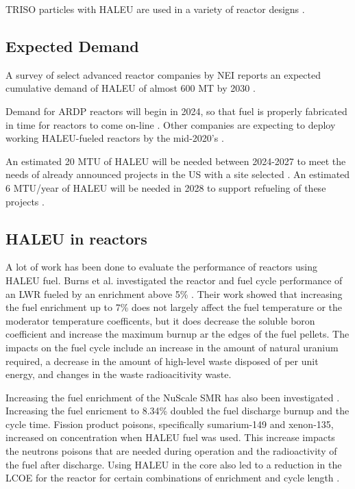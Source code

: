 \gls{TRISO} particles with \gls{HALEU} are used in a variety of reactor designs 
\cite{harlan_x-energy_2018,mitchell_usnc_2020,hussain_advances_2018}.

\subsection{Expected Demand}
A survey of select advanced reactor companies by \gls{NEI} reports an 
expected cumulative demand of \gls{HALEU} of almost 600 MT by 2030 
\cite{korsnick_need_2018}.

Demand for ARDP reactors will begin in 2024, so that fuel is 
properly fabricated in time for reactors to come on-line \cite{noauthor_establishing_2022}.
Other companies are expecting to deploy working \gls{HALEU}-fueled reactors 
by the mid-2020's \cite{noauthor_establishing_2022}.

An estimated 20 MTU of \gls{HALEU} will be needed between 2024-2027 to 
meet the needs of already announced projects in the US with a site 
selected \cite{noauthor_establishing_2022}. An estimated 6 MTU/year of 
\gls{HALEU} will be needed in 2028 to support refueling of these projects 
\cite{noauthor_establishing_2022}. 

\subsection{HALEU in reactors}
A lot of work has been done to evaluate the performance of reactors 
using \gls{HALEU} fuel. Burns et al. investigated the reactor and fuel cycle 
performance of an \gls{LWR} fueled by an enrichment above 5\% \cite{burns_reactor_2020}.
Their work showed that increasing the fuel enrichment up to 7\% does not 
largely affect the fuel temperature or the moderator temperature coefficents,
but it does decrease the soluble boron coefficient and increase the maximum 
burnup ar the edges of the fuel pellets. The impacts on the fuel cycle include 
an increase in the amount of natural uranium required, a decrease in the 
amount of high-level waste disposed of per unit energy, and changes in the 
waste radioacitivity waste. 

Increasing the fuel enrichment of the NuScale \gls{SMR} has also been investigated 
\cite{carlson_implications_2022}. Increasing the fuel enricment to 8.34\% doubled the 
fuel discharge burnup and the cycle time. Fission product poisons, specifically 
sumarium-149 and xenon-135, increased on concentration when \gls{HALEU} fuel was used. 
This increase impacts the neutrons poisons that are needed during operation and the 
radioactivity of the fuel after discharge. Using \gls{HALEU} in the core also led 
to a reduction in the \gls{LCOE} for the reactor for certain combinations of 
enrichment and cycle length \cite{carlson_economic_2020,carlson_implications_2022}.

